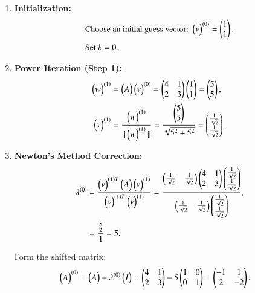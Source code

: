 \documentclass[journal,12pt,onecolumn]{IEEEtran}
\theoremstyle{remark}
\begin{document}
\begin{enumerate}
    \item \textbf{Initialization:}
    \begin{align*}
        &\text{Choose an initial guess vector: } 
        \begin{pmatrix}v\end{pmatrix}^{(0)} = \begin{pmatrix}
        1 \\
        1
        \end{pmatrix}. \\
        &\text{Set } k = 0.
    \end{align*}
    
    \item \textbf{Power Iteration (Step 1):}
    \begin{align*}
        \begin{pmatrix}w\end{pmatrix}^{(1)} &= \begin{pmatrix}A\end{pmatrix}\begin{pmatrix}v\end{pmatrix}^{(0)} = 
        \begin{pmatrix}
        4 & 1 \\
        2 & 3
        \end{pmatrix}
        \begin{pmatrix}
        1 \\
        1
        \end{pmatrix}
        =
        \begin{pmatrix}
        5 \\
        5
        \end{pmatrix}, \\
        \begin{pmatrix}v\end{pmatrix}^{(1)} &= \frac{\begin{pmatrix}w\end{pmatrix}^{(1)}}{\|\begin{pmatrix}w\end{pmatrix}^{(1)}\|} = 
        \frac{\begin{pmatrix}
        5 \\
        5
        \end{pmatrix}}{\sqrt{5^2 + 5^2}} = 
        \begin{pmatrix}
        \frac{1}{\sqrt{2}} \\
        \frac{1}{\sqrt{2}}
        \end{pmatrix}.
    \end{align*}
    
    \item \textbf{Newton's Method Correction:}
    \begin{align*}
        \lambda^{(0)} &= \frac{\begin{pmatrix}v\end{pmatrix}^{(1)T}\begin{pmatrix}A\end{pmatrix}\begin{pmatrix}v\end{pmatrix}^{(1)}}{\begin{pmatrix}v\end{pmatrix}^{(1)T}\begin{pmatrix}v\end{pmatrix}^{(1)}} = 
        \frac{\begin{pmatrix}
        \frac{1}{\sqrt{2}} & \frac{1}{\sqrt{2}}
        \end{pmatrix}
        \begin{pmatrix}
        4 & 1 \\
        2 & 3
        \end{pmatrix}
        \begin{pmatrix}
        \frac{1}{\sqrt{2}} \\
        \frac{1}{\sqrt{2}}
        \end{pmatrix}}{\begin{pmatrix}
        \frac{1}{\sqrt{2}} & \frac{1}{\sqrt{2}}
        \end{pmatrix}
        \begin{pmatrix}
        \frac{1}{\sqrt{2}} \\
        \frac{1}{\sqrt{2}}
        \end{pmatrix}}, \\
        &= \frac{\frac{5}{2}}{1} = 5.
    \end{align*}
    
    Form the shifted matrix:
    \begin{align*}
    \begin{pmatrix}A\end{pmatrix}^{(0)} &= \begin{pmatrix}A\end{pmatrix} - \lambda^{(0)}\begin{pmatrix}I\end{pmatrix} = 
    \begin{pmatrix}
    4 & 1 \\
    2 & 3
    \end{pmatrix} - 
    5 \begin{pmatrix}
    1 & 0 \\
    0 & 1
    \end{pmatrix} = 
    \begin{pmatrix}
    -1 & 1 \\
    2 & -2
    \end{pmatrix}.
    \end{align*}


\end{enumerate}
\end{document}
